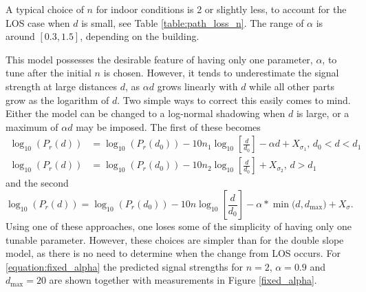 \documentclass{LTHthesis}
\begin{document}
A typical choice of $n$ for indoor conditions is 2 or slightly less, to account for the LOS case when $d$ is small, see Table \ref{table:path_loss_n}. The range of $\alpha$ is around $[0.3,1.5]$, depending on the building.

This model possesses the desirable feature of having only one parameter, $\alpha$, to tune after the initial $n$ is chosen. However, it tends to underestimate the signal strength at large distances $d$, as $\alpha d$ grows linearly with $d$ while all other parts grow as the logarithm of $d$. Two simple ways to correct this easily comes to mind. Either the model can be changed to a log-normal shadowing when $d$ is large, or a maximum of $\alpha d $ may be imposed. The first of these becomes
%
\begin{subequations}
\begin{align}
\log_{10}({P_r(d)})&=\log_{10}({P_r(d_0)})-10n_1\log_{10}\left[{\frac{d}{d_0}}\right] -\alpha d+ X_{\sigma_1}, \hspace{2pt} d_0<d<d_1\\
\log_{10}({P_r(d)})&=\log_{10}({P_r(d_0)})-10n_2\log_{10}\left[{\frac{d}{d_0}}\right] + X_{\sigma_2}, \hspace{2pt} d>d_1
\end{align}
\end{subequations} 
and the second
\begin{equation}
\log_{10}({P_r(d)})=\log_{10}({P_r(d_0)})-10n\log_{10}\left[{\frac{d}{d_0}}\right] - \alpha*\min({d, d_{\text{max}})}+ X_\sigma.
\label{equation:fixed_alpha}
\end{equation}
%
Using one of these approaches, one loses some of the simplicity of having only one tunable parameter. However, these choices are simpler than for the double slope model, as there is no need to determine when the change from LOS occurs. 
For \ref{equation:fixed_alpha} the predicted signal strengths for $n=2$, $\alpha=0.9$ and $d_{\text{max}}=20$ are shown together with measurements in Figure \ref{fixed_alpha}. 
\end{document}
